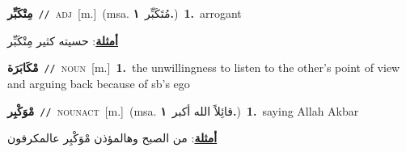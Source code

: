 \documentclass[10pt,a4paper,twoside]{article} %
\begin{document}
\begin{multicols}{2}
{\setlength\topsep{0pt}\textbf{\foreignlanguage{arabic}{مِتْكَبِّر}}\ {\color{gray}\texttt{//}\color{black}}\ \textsc{adj}\ [m.]\ \color{gray}(msa. \foreignlanguage{arabic}{مُتَكَبِّر}~\foreignlanguage{arabic}{\textbf{١.}})\color{black}\ \textbf{1.}~arrogant\  \begin{flushright}\color{gray}\foreignlanguage{arabic}{\textbf{\underline{\foreignlanguage{arabic}{أمثلة}}}: حسيته كثير مِتْكَبِّر}\end{flushright}\color{black}} \vspace{2mm}

{\setlength\topsep{0pt}\textbf{\foreignlanguage{arabic}{مْكَابَرَة}}\ {\color{gray}\texttt{//}\color{black}}\ \textsc{noun}\ [m.]\ \textbf{1.}~the unwillingness to listen to the other's point of view and arguing back because of sb's ego\ } \vspace{2mm}

{\setlength\topsep{0pt}\textbf{\foreignlanguage{arabic}{مْوَكْبِر}}\ {\color{gray}\texttt{//}\color{black}}\ \textsc{noun\textunderscore act}\ [m.]\ \color{gray}(msa. \foreignlanguage{arabic}{قائِلاً الله أكبر}~\foreignlanguage{arabic}{\textbf{١.}})\color{black}\ \textbf{1.}~saying Allah Akbar\  \begin{flushright}\color{gray}\foreignlanguage{arabic}{\textbf{\underline{\foreignlanguage{arabic}{أمثلة}}}: من الصبح وهالمؤذن مْوَكْبِر عالمكرفون}\end{flushright}\color{black}} \vspace{2mm}


\end{multicols}
\end{document}

